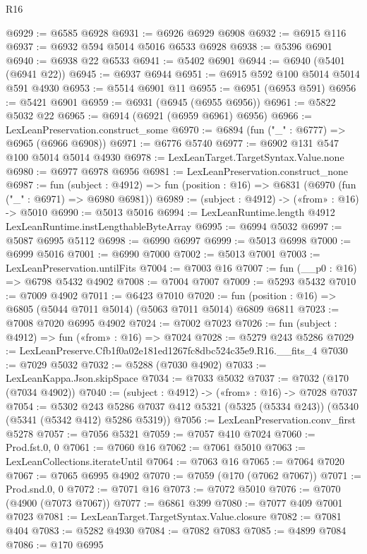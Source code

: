 \begin{lexlean}{R16}
\begin{coremodule}
@6929 := @6585 @6928
@6931 := @6926 @6929 @6908
@6932 := @6915 @116
@6937 := @6932 @594 @5014 @5016 @6533 @6928
@6938 := @5396 @6901
@6940 := @6938 @22 @6533
@6941 := @5402 @6901
@6944 := @6940 (@5401 (@6941 @22))
@6945 := @6937 @6944
@6951 := @6915 @592 @100 @5014 @5014 @591 @4930
@6953 := @5514 @6901 @11
@6955 := @6951 (@6953 @591)
@6956 := @5421 @6901
@6959 := @6931 (@6945 (@6955 @6956))
@6961 := @5822 @5032 @22
@6965 := @6914 (@6921 (@6959 @6961) @6956)
@6966 := LexLeanPreservation.construct_some
@6970 := @6894 (fun ("_" : @6777) => @6965 (@6966 @6908))
@6971 := @6776 @5740
@6977 := @6902 @131 @547 @100 @5014 @5014 @4930
@6978 := LexLeanTarget.TargetSyntax.Value.none
@6980 := @6977 @6978 @6956
@6981 := LexLeanPreservation.construct_none
@6987 := fun (subject : @4912) =>
  fun (position : @16) => @6831 (@6970 (fun ("_" : @6971) => @6980 @6981))
@6989 := (subject : @4912) -> («from» : @16) -> @5010
@6990 := @5013 @5016
@6994 := LexLeanRuntime.length @4912 LexLeanRuntime.instLengthableByteArray
@6995 := @6994 @5032
@6997 := @5087 @6995 @5112
@6998 := @6990 @6997
@6999 := @5013 @6998
@7000 := @6999 @5016
@7001 := @6990 @7000
@7002 := @5013 @7001
@7003 := LexLeanPreservation.untilFits
@7004 := @7003 @16
@7007 := fun (__p0 : @16) => @6798 @5432 @4902
@7008 := @7004 @7007
@7009 := @5293 @5432
@7010 := @7009 @4902
@7011 := @6423 @7010
@7020 := fun (position : @16) => @6805 (@5044 @7011 @5014) (@5063 @7011 @5014) @6809 @6811
@7023 := @7008 @7020 @6995 @4902
@7024 := @7002 @7023
@7026 := fun (subject : @4912) => fun («from» : @16) => @7024
@7028 := @5279 @243 @5286
@7029 := LexLeanPreserve.Cfb1f0a02e181ed1267fc8dbc524c35e9.R16.__fits_4
@7030 := @7029 @5032
@7032 := @5288 (@7030 @4902)
@7033 := LexLeanKappa.Json.skipSpace
@7034 := @7033 @5032
@7037 := @7032 (@170 (@7034 @4902))
@7040 := (subject : @4912) -> («from» : @16) -> @7028 @7037
@7054 := @5302
    @243
    @5286
    @7037
    @412
    @5321
    (@5325 (@5334 @243))
    (@5340 (@5341 (@5342 @412) @5286 @5319))
@7056 := LexLeanPreservation.conv_first @5278
@7057 := @7056 @5321
@7059 := @7057 @410 @7024
@7060 := Prod.fst.{0, 0}
@7061 := @7060 @16
@7062 := @7061 @5010
@7063 := LexLeanCollections.iterateUntil
@7064 := @7063 @16
@7065 := @7064 @7020
@7067 := @7065 @6995 @4902
@7070 := @7059 (@170 (@7062 @7067))
@7071 := Prod.snd.{0, 0}
@7072 := @7071 @16
@7073 := @7072 @5010
@7076 := @7070 (@4900 (@7073 @7067))
@7077 := @6861 @399
@7080 := @7077 @409 @7001 @7023
@7081 := LexLeanTarget.TargetSyntax.Value.closure
@7082 := @7081 @404
@7083 := @5282 @4930
@7084 := @7082 @7083
@7085 := @4899 @7084
@7086 := @170 @6995

\end{coremodule}
\end{lexlean}
